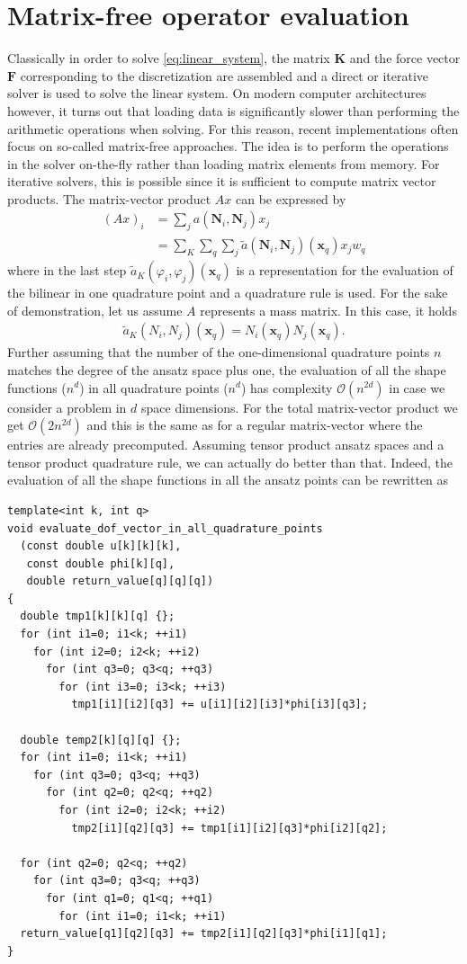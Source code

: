 \documentclass[preprint,12pt,times]{elsarticle}
\def\gz  #1{           \mbox{$\boldsymbol{#1}$}}
\begin{document}
\section{Matrix-free operator evaluation}
\label{sec:mf}
Classically in order to solve \eqref{eq:linear_system}, the matrix $\gz K$ and the force vector $\gz F$ corresponding to the discretization are assembled and
a direct or iterative solver is used to solve the linear system.
On modern computer architectures however, it turns out that loading data is significantly slower than performing the arithmetic operations when solving.
For this reason, recent implementations often focus on so-called matrix-free approaches. The idea is to perform the operations in the solver on-the-fly
rather than loading matrix elements from memory.
For iterative solvers, this is possible since it is sufficient to compute matrix vector products.
%
The matrix-vector product $A x$ can be expressed by
\begin{align*}
 (Ax)_i &= \sum_j a(\gz N_i,\gz N_j) x_j \\
        &= \sum_K\sum_q \sum_j \tilde{a}(\gz N_i,\gz N_j)(\gz x_q) x_j w_q
\end{align*}
where in the last step $\tilde{a}_K(\varphi_i,\varphi_j)(\gz x_q)$ is a representation for the evaluation of the bilinear in one quadrature point and a quadrature rule is used.
For the sake of demonstration, let us assume $A$ represents a mass matrix. In this case, it holds
\begin{align*}
 \tilde{a}_K(N_i,N_j)(\gz x_q) = N_i(\gz x_q)N_j(\gz x_q).
\end{align*}
Further assuming that the number of the one-dimensional quadrature points $n$ matches the degree of the ansatz space plus one, the evaluation of all the shape functions ($n^d$)
in all quadrature points ($n^d$) has complexity $\mathcal{O}(n^{2d})$ in case we consider a problem in $d$ space dimensions. For the total matrix-vector product we get $\mathcal{O}(2n^{2d})$
and this is the same as for a regular matrix-vector where the entries are already precomputed. Assuming tensor product ansatz spaces and a tensor product quadrature rule, we can actually do better
than that. Indeed, the evaluation of all the shape functions in all the ansatz points can be rewritten as
\begin{lstlisting}
template<int k, int q>
void evaluate_dof_vector_in_all_quadrature_points
  (const double u[k][k][k],
   const double phi[k][q],
   double return_value[q][q][q])
{
  double tmp1[k][k][q] {};
  for (int i1=0; i1<k; ++i1)
    for (int i2=0; i2<k; ++i2)
      for (int q3=0; q3<q; ++q3)
        for (int i3=0; i3<k; ++i3)
          tmp1[i1][i2][q3] += u[i1][i2][i3]*phi[i3][q3];

  double temp2[k][q][q] {};
  for (int i1=0; i1<k; ++i1)
    for (int q3=0; q3<q; ++q3)
      for (int q2=0; q2<q; ++q2)
        for (int i2=0; i2<k; ++i2)
          tmp2[i1][q2][q3] += tmp1[i1][i2][q3]*phi[i2][q2];

  for (int q2=0; q2<q; ++q2)
    for (int q3=0; q3<q; ++q3)
      for (int q1=0; q1<q; ++q1)
        for (int i1=0; i1<k; ++i1)
  return_value[q1][q2][q3] += tmp2[i1][q2][q3]*phi[i1][q1];
}
\end{lstlisting}
\end{document}
